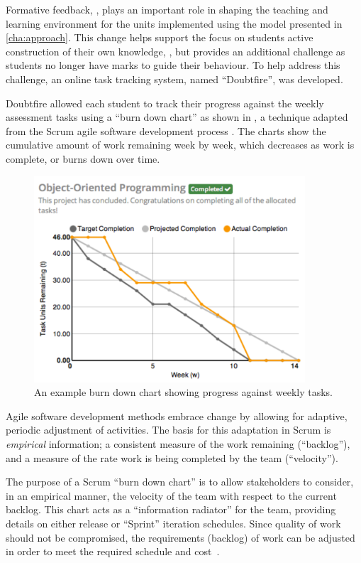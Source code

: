 Formative feedback, , plays an important role in shaping the teaching and learning environment for the units implemented using the model presented in \cref{cha:approach}. This change helps support the focus on students active construction of their own knowledge, , but provides an additional challenge as students no longer have marks to guide their behaviour. To help address this challenge, an online task tracking system, named ``Doubtfire'', was developed. 

Doubtfire allowed each student to track their progress against the weekly assessment tasks using a ``burn down chart'' as shown in , a technique adapted from the Scrum agile software development process \cite{Schwaber:2002}. The charts show the cumulative amount of work remaining week by week, which decreases as work is complete, or burns down over time.

\begin{figure}[thb]
  \centering
  \includegraphics[width=0.9\textwidth]{ExampleChart}
  \caption{An example burn down chart showing progress against weekly tasks.}
  \label{fig:example_chart}
\end{figure}

Agile software development methods \cite{Beck:2001} embrace change \cite{Beck:2000} by allowing for adaptive, periodic adjustment of activities. The basis for this adaptation in Scrum is \emph{empirical} information; a consistent measure of the work remaining (``backlog''), and a measure of the rate work is being completed by the team (``velocity'').

The purpose of a Scrum ``burn down chart'' is to allow stakeholders to consider, in an empirical manner, the velocity of the team with respect to the current backlog. This chart acts as a ``information radiator'' \cite{Cockburn:2002} for the team, providing details on either release or ``Sprint'' iteration schedules. Since quality of work should not be compromised, the requirements (backlog) of work can be adjusted in order to meet the required schedule and cost~\cite{Sutherland:2007}.

